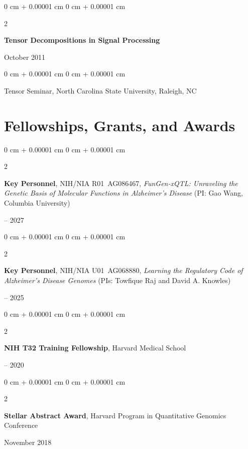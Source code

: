 \documentclass[10pt, letterpaper]{article}
\newenvironment{onecolentry}{
    \begin{adjustwidth}{
        0 cm + 0.00001 cm
    }{
        0 cm + 0.00001 cm
    }
}{
    \end{adjustwidth}
} %
\newenvironment{twocolentry}[2][]{
    \onecolentry
    \def\secondColumn{#2}
    \setcolumnwidth{\fill, 4.5 cm}
    \begin{paracol}{2}
}{
    \switchcolumn \raggedleft \secondColumn
    \end{paracol}
    \endonecolentry
} %
\begin{document}
    \vspace{0.20 cm}

    \begin{samepage}
        \begin{twocolentry}{
            October 2011
        }
            \textbf{Tensor Decompositions in Signal Processing}
        \end{twocolentry}

        \vspace{0.10 cm}

        \begin{onecolentry}
            Tensor Seminar, North Carolina State University, Raleigh, NC
        \end{onecolentry}
    \end{samepage}





\section{Fellowships, Grants, and Awards}

    \begin{twocolentry}{
        2026 – 2027
    }
        \textbf{Key Personnel}, NIH/NIA R01~AG086467, \textit{FunGen-xQTL: Unraveling the Genetic Basis of Molecular Functions in Alzheimer's Disease} (PI: Gao Wang, Columbia University)
    \end{twocolentry}

    \vspace{0.20 cm}

    \begin{twocolentry}{
        2021 – 2025
    }
        \textbf{Key Personnel}, NIH/NIA U01~AG068880, \textit{Learning the Regulatory Code of Alzheimer's Disease Genomes} (PIs: Towfique Raj and David A. Knowles)
    \end{twocolentry}

    \vspace{0.20 cm}

    \begin{twocolentry}{
        2018 – 2020
    }
        \textbf{NIH T32 Training Fellowship}, Harvard Medical School
    \end{twocolentry}

    \vspace{0.20 cm}

    \begin{twocolentry}{
        November 2018
    }
        \textbf{Stellar Abstract Award}, Harvard Program in Quantitative Genomics Conference
    \end{twocolentry}
\end{document}
